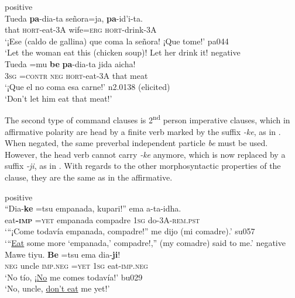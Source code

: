 \documentclass[output=paper]{langsci/langscibook}
\begin{document}
\begin{exe}\ex\label{ex:tacana-hortative}
\begin{xlist}
\ex\label{ex:tacana-hortative-positive} positive\\
\gll {}Tueda \textbf{pa}-dia-ta señora=ja,
\textbf{pa}-id'i-ta.\\
that \textsc{hort}-eat-3A wife\textsc{=erg} \textsc{hort-}drink-3A\\
\glt `¡Ese (caldo de gallina) que coma la señora! ¡Que tome!' pa044\\
‘Let the woman eat this (chicken soup)! Let her drink it!
\ex\label{ex:tacana-hortative-negative} negative\\
\gll {}Tueda =mu \textbf{be} \textbf{pa}-dia-ta jida aicha{\cb}!\\
3\textsc{sg} =\textsc{contr} \textsc{neg} \textsc{hort-}eat-3A that meat\\
\glt `¡Que el no coma esa carne!' n2.0138 (elicited)\\
`Don't let him eat that meat!'
\end{xlist}\end{exe}

The second type of command clauses is 2\textsuperscript{nd} person
imperative clauses, which in affirmative polarity are head by a finite
verb marked by the suffix \textit{-ke}, as in
. When negated, the
same preverbal independent particle \textit{be} must be used.
However, the head verb cannot carry \textit{-ke} anymore, which is now
replaced by a suffix \textit{-ji}, as in
. With regards to the other morphosyntactic properties of the clause, they are the same as in the affirmative.

\begin{exe}\ex\label{ex:tacana-imperative} 
\begin{xlist}
\ex\label{ex:tacana-imperative-positive} positive\\
\gll ``Dia-\textbf{ke}  =tsu  empanada,  kupari!''  ema  a-ta-idha.\\
    eat\textbf{-\textsc{imp}}  =\textsc{yet}  empanada  compadre
    1\textsc{sg}  do-3A\textsc{-rem.pst}\\
\glt `{}``¡Come todavía empanada, compadre!'' me dijo (mi comadre).' su057\\
`{}``\uline{Eat} some more `empanada,' compadre!,'' (my comadre) said to me.'
\ex\label{ex:tacana-imperative-negative} negative\\
\gll
Mawe  tiyu.  \textbf{Be}  =tsu  ema  dia-\textbf{ji}!\\
\textsc{neg}  uncle  \textsc{imp.neg}  =\textsc{yet}  1\textsc{sg}
eat-\textsc{imp.neg}\\
\glt `No tío, ¡\uline{No} me comes todavía!' bu029\\
`No, uncle, \uline{don't eat} me yet!'
\end{xlist}\end{exe}
\end{document}
